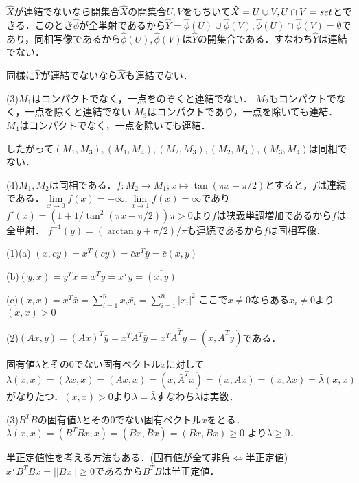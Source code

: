 \documentclass[
		book,
		head_space=20mm,
		foot_space=20mm,
		gutter=10mm,
		line_length=190mm
]{jlreq}
\begin{document}
$\hat{X}$が連結でないなら開集合$\hat{X}$の開集合$U,V$をもちいて$\hat{X}=U \cup V,U\cap V = \empty set$とできる．このとき$\hat{\phi}$が全単射であるから$\hat{Y}=\hat{\phi}(U)\cup \hat{\phi}(V),\hat{\phi}(U)\cap \hat{\phi}(V)=\emptyset$であり，同相写像であるから$\hat{\phi}(U),\hat{\phi}(V)$は$\hat{Y}$の開集合である．すなわち$\hat{Y}$は連結でない．

同様に$\hat{Y}$が連結でないなら$\hat{X}$も連結でない．

(3)$M_1$はコンパクトでなく，一点をのぞくと連結でない．
$M_2$もコンパクトでなく，一点を除くと連結でない
$M_3$はコンパクトであり，一点を除いても連結．
$M_4$はコンパクトでなく，一点を除いても連結．

したがって$(M_1,M_3),(M_1,M_4),(M_2,M_3),(M_2,M_4),(M_3,M_4)$は同相でない．

(4)$M_1,M_2$は同相である．$f\colon M_2 \rightarrow M_1;x\mapsto \tan(\pi x-\pi/2)$とすると，$f$は連続である．$\lim\limits_{x\to 0}f(x)=-\infty,\lim\limits_{x\to 1}f(x)=\infty$であり$f'(x)=(1+1/\tan^2(\pi x-\pi/2))\pi>0$より$f$は狭義単調増加であるから$f$は全単射．
$f^{-1}(y)=(\arctan y+\pi/2)/\pi$も連続であるから$f$は同相写像．

(1)(a) $(x,cy)=x^T\bar{(cy)}=\bar{c}x^T\bar{y}=\bar{c}(x,y)$

(b)$(y,x)=y^T\bar{x}=\bar{x}^Ty = \overline{x^T\bar{y}}=\overline{(x,y)}$

(c)$(x,x)=x^T\bar{x}=\sum\limits_{i=1}^n x_i\bar{x_i}=\sum\limits_{i=1}^n |x_i|^2$
ここで$x\neq 0$ならある$x_i\neq 0$より$(x,x)>0$

(2)$(Ax,y)=(Ax)^T\bar{y}=x^TA^T\bar{y}=x^T\overline{\bar{A}^Ty}=(x,\bar{A}^Ty)$である．

固有値$\lambda$とその$0$でない固有ベクトル$x$に対して
$\lambda(x,x)=(\lambda x,x)=(Ax,x)=(x,\bar{A}^T x)=(x,Ax)=(x,\lambda x)=\bar{\lambda}(x,x)$がなりたつ．$(x,x)>0$より$\lambda=\bar{\lambda}$すなわち$\lambda$は実数．

(3)$B^TB$の固有値$\lambda$とその$0$でない固有ベクトル$x$をとる．
$\lambda(x,x)=(B^TBx,x)=(Bx,\bar{B}x)=(Bx,Bx)\ge 0$
より$\lambda\ge 0$．
\begin{tcolorbox}[blanker,breakable,
    left=3mm,right=3mm,
    top=3mm,bottom=3mm,
    before skip=15pt,after skip=15pt,
    borderline vertical={1pt}{0pt}{black,dotted}]
    半正定値性を考える方法もある．(固有値が全て非負$\Leftrightarrow$半正定値)
	$x^TB^TBx=||Bx||\ge 0$であるから$B^TB$は半正定値．
    \end{tcolorbox}
\end{document}
